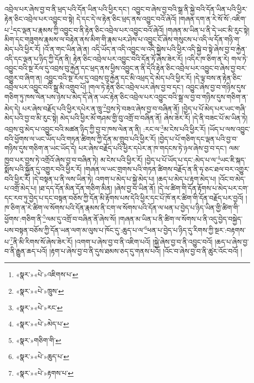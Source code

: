འབྲེལ་པར་ཞེས་བྱ་བ་ནི་ཕྲད་པའི་དོན་ཡིན་པའི་ཕྱིར་དང་། འབྱུང་བ་ཞེས་བྱ་བའི་སྒྲ་ནི་སྐྱེ་བའི་དོན་ཡིན་པའི་ཕྱིར་རྟེན་ཅིང་འབྲེལ་པར་འབྱུང་བ་སྟེ། དེ་དང་དེ་ལ་རྟེན་ཅིང་ཕྲད་ནས་འབྱུང་བའོ་ཞེའོ། །གཞན་དག་ན་རེ་སོ་སོ་:འཇིག་པ་\footnote{«སྣར་»«པེ་»འཇིགས་པ་}དང་ལྡན་པ་རྣམས་ཀྱི་འབྱུང་བ་ནི་རྟེན་ཅིང་འབྲེལ་པར་འབྱུང་བའོ་ཞེའོ། །གཞན་མ་ཡིན་པ་ནི་དེ་ཡང་མི་རུང་སྟེ། མིག་དང་གཟུགས་རྣམས་ལ་བརྟེན་ནས་མིག་གི་རྣམ་པར་ཤེས་པ་འབྱུང་ངོ་ཞེས་གསུངས་པ་འདི་ལ་དོན་གཉི་ག་མེད་པའི་ཕྱིར་རོ། །འོ་ན་གང་ཡིན་ཞེ་ན། འདི་ཡོད་ན་འདི་འབྱུང་ལ་འདི་སྐྱེས་པའི་ཕྱིར་འདི་སྐྱེ་བ་སྟེ་ཞེས་བྱ་བ་རྐྱེན་འདི་དང་ལྡན་པ་ཉིད་ཀྱི་དོན་ནི། རྟེན་ཅིང་འབྲེལ་པར་འབྱུང་བའི་དོན་ཏོ་ཞེས་ཟེར་རོ། །འདིར་ཁ་ཅིག་ན་རེ། གལ་ཏེ་འབྱུང་བའི་སྔ་རོལ་དུ་འབྲས་བུ་རྐྱེན་དང་ཕྲད་ནས་ཕྱིས་འབྱུང་ན་ནི་དེའི་རྟེན་ཅིང་འབྲེལ་པར་འབྱུང་བ་ཞེས་བྱ་བར་འགྱུར་བ་ཞིག་ན། འབྱུང་བའི་སྔ་རོལ་དུ་འབྲས་བུ་རྐྱེན་དང་མི་འཕྲད་དེ་མེད་པའི་ཕྱིར་རོ། །དེ་ལྟ་བས་ན་རྟེན་ཅིང་འབྲེལ་པར་འབྱུང་བའི་སྒྲ་མི་འགྲུབ་པོ། །གལ་ཏེ་རྟེན་ཅིང་འབྲེལ་པར་ཞེས་བྱ་བ་དང་། འབྱུང་ཞེས་བྱ་བ་གཉིས་དུས་གཅིག་ཏུ་ཁས་ལེན་པས་ཉེས་པ་མེད་དོ་ཞེ་ན་ཡང་རྟེན་ཅིང་འབྲེལ་པར་འབྱུང་བའི་སྒྲ་ལ་བྱ་བ་གཉིས་དུས་གཅིག་ན་མེད་དེ། པར་ཞེས་བརྗོད་པའི་ཕྱིར་དཔེར་ན་ཁྲུ་\footnote{«སྣར་»«པེ་»ཁྲུས་}བྱས་ཏེ་བཟའ་ཞེས་བྱ་བ་བཞིན་ནོ། །བྱེད་པ་པོ་མེད་པར་ཡང་གཞི་མེད་པའི་བྱ་བ་མི་རུང་སྟེ། མེད་པའི་ཕྱིར་མོ་གཤམ་གྱི་བུ་འགྲོ་བ་བཞིན་ནོ། ཞེས་ཟེར་རོ། །དེ་ནི་བཟང་པོ་མ་ཡིན་ཏེ། འབྲས་བུ་མེད་པ་འབྱུང་བའི་མཚན་ཉིད་ཀྱི་བྱ་བ་ཁས་ལེན་ན་ནི། :རང་ལ་\footnote{«སྣར་»«པེ་»རང་}མ་ངེས་པའི་ཕྱིར་རོ། །ཡོད་པ་ལས་འབྱུང་བའི་ཕྱོགས་ལ་ཡང་ཡོད་པའི་གཏན་ཚིགས་ཀྱི་དོན་མ་གྲུབ་པའི་ཕྱིར་རོ། །བྱེད་པ་པོ་གཅིག་དང་ལྡན་པའི་བྱ་བ་གཉིས་དུས་གཅིག་ན་ཡང་ཡོད་དེ། པར་ཞེས་བརྗོད་པའི་ཕྱིར་དཔེར་ན་ཁ་གདངས་ཏེ་ཉལ་ཞེས་བྱ་བ་དང་། ལམ་ཁྱབ་པར་བྱས་ཏེ་འགྲོའོ་ཞེས་བྱ་བ་བཞིན་ཏེ། མ་ངེས་པའི་ཕྱིར་རོ། །བྱེད་པ་པོ་ཡོད་པ་དང་:མེད་པ་ལ་\footnote{«སྣར་»«པེ་»མེད་པ་}ཡང་ཇི་སྐད་སྨོས་པའི་སྐྱོན་དུ་འགྱུར་བའི་ཕྱིར་རོ། །གཞན་ལ་ཡང་གྲགས་པའི་གཏན་ཚིགས་བརྗོད་ན་ནི་ཧ་ཅང་ཐལ་བར་འགྱུར་བའི་ཕྱིར་རོ། །དེ་བསྟན་པ་ནི་ལས་ཡིན་ཏེ། འགག་པ་མེད་པ་སྐྱེ་མེད་པ། །ཆད་པ་མེད་པ་རྟག་མེད་པ། །འོང་བ་མེད་པ་འགྲོ་མེད་པ། །ཐ་དད་དོན་མིན་དོན་གཅིག་མིན། །ཞེས་བྱ་བ་ཡིན་ནོ། །དེ་ལ་ཚིག་གི་དོན་རྟོགས་པ་མེད་པར་ངག་དང་རབ་ཏུ་བྱེད་པ་དང་བསྟན་བཅོས་ཀྱི་དོན་མི་རྟོགས་པས་དེའི་ཕྱིར་དང་པོ་ཁོ་ནར་ཚིག་གི་དོན་བརྗོད་པར་བྱའོ། །ཁ་ཅིག་ན་རེ་ཚིག་ལ་སོགས་པའི་དོན་རྣམས་ནི་ངག་ལ་སོགས་པའི་དོན་ལ་ཕན་པ་བྱེད་པ་ཉིད་ཡིན་གྱི་ཚིག་གི་ཕྱོགས་:གཅིག་ནི་\footnote{«སྣར་»གཅིག་གི་}ལམ་དུ་འགྲོ་བ་བཞིན་ནོ་ཞེས་སོ། །གཞན་མ་ཡིན་པ་ནི་ཚིག་ལ་སོགས་པ་ནི་འདུ་བྱེད་བསྐྱེད་པས་བསྟན་བཅོས་ཀྱི་དོན་ཡན་ལག་མ་ལུས་པ་ཁོང་དུ་:ཆུད་པ་ལ་\footnote{«སྣར་»«པེ་»ཆུད་པ་}ཕན་པ་བྱེད་པ་ཉིད་དུ་རིགས་ཀྱི་སྔར་:བརྟགས་པ་\footnote{«སྣར་»«པེ་»རྟགས་པ་}ནི་མི་རིགས་སོ་ཞེས་ཟེར་རོ། །འགག་པ་ཞེས་བྱ་བ་ནི་འཇིག་པའོ། །སྐྱེ་ཞེས་བྱ་བ་ནི་འབྱུང་བའོ། །ཆད་པ་ཞེས་བྱ་བ་ནི་རྒྱུན་ཆད་པའོ། །རྟག་པ་ཞེས་བྱ་བ་ནི་དུས་ཐམས་ཅད་དུ་གནས་པའོ། །འོང་བ་ཞེས་བྱ་བ་ནི་ཚུར་འོང་བའོ། །
